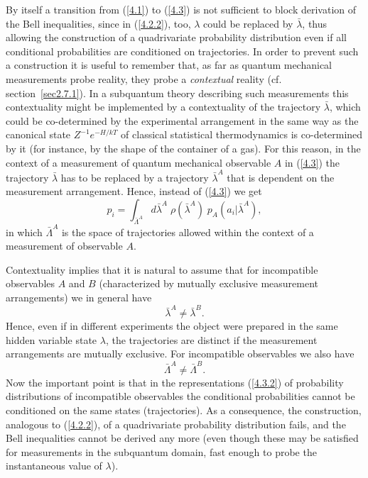 \documentclass[12pt]{article}
\begin{document}
By itself a transition from (\ref{4.1}) to (\ref{4.3}) is not
sufficient to block derivation of the Bell inequalities, since in
(\ref{4.2.2}), too, $\lambda$ could be replaced by
$\bar{\lambda}$, thus allowing the construction of a quadrivariate
probability distribution even if all conditional probabilities are
conditioned on trajectories. In order to prevent such a
construction it is useful to remember that, as far as quantum
mechanical measurements probe reality, they probe a {\em
contextual} reality (cf. section~\ref{sec2.7.1}). In a subquantum
theory describing such measurements this contextuality might be
implemented by a contextuality of the trajectory $\bar{\lambda}$,
which could be co-determined by the experimental arrangement in
the same way as the canonical state $Z^{-1}e^{-H/kT}$ of classical
statistical thermodynamics is co-determined by it (for instance,
by the shape of the container of a gas). For this reason, in the
context of a measurement of quantum mechanical observable $A$ in
(\ref{4.3}) the trajectory $\bar{\lambda}$ has to be replaced by a
trajectory $\bar{\lambda}^A$ that is dependent on the measurement
arrangement. Hence, instead of (\ref{4.3}) we get
\begin{equation}\label{4.3.2}
p_i=\int_{\bar{\Lambda}^A}
d\bar{\lambda}^A\;\rho(\bar{\lambda}^A)\;p_A(a_i|\bar{\lambda}^A),
\end{equation}
in which $\bar{\Lambda}^A$ is the space of trajectories allowed
within the context of a measurement of observable $A$.

Contextuality implies that it is natural to assume that for
incompatible observables $A$ and $B$ (characterized by mutually
exclusive measurement arrangements) we in general have
\begin{equation}\label{4.4}
\bar{\lambda}^A \neq \bar{\lambda}^B.
\end{equation}
Hence, even if in different experiments the object were prepared
in the same hidden variable state $\lambda$, the trajectories are
distinct if the measurement arrangements are mutually exclusive.
For incompatible observables we also have
\[\bar{\Lambda}^A \neq \bar{\Lambda}^B.\]
Now the important point is that in the representations
(\ref{4.3.2}) of probability distributions of incompatible
observables the conditional probabilities cannot be conditioned on
the same states (trajectories). As a consequence, the
construction, analogous to (\ref{4.2.2}), of a quadrivariate
probability distribution fails, and the Bell inequalities cannot
be derived any more (even though these may be satisfied for
measurements in the subquantum domain, fast enough to probe the
instantaneous value of $\lambda$).
\end{document}
